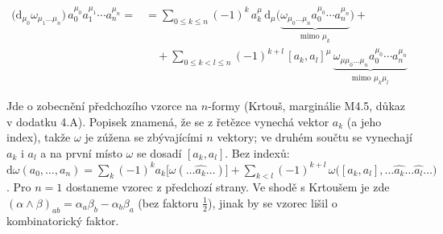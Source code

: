 \begin{veta}[Theorem]
\begin{align*}
  \big(\mathrm{d}_{\mu_0}\omega_{\mu_1\dots\mu_n}\big)\,a_0^{\mu_0}a_1^{\mu_1}\cdots a_n^{\mu_n} =
  &= \sum_{0\leq k\leq n}(-1)^k\,a_k^{\mu}\,\mathrm{d}_\mu\Big(\underbrace{\omega_{\mu_0\dots\mu_n}a_0^{\mu_0}\cdots a_n^{\mu_n}}_{\text{mimo } \mu_k}\Big) + \\
  &\quad + \sum_{0\leq k<l\leq n}(-1)^{k+l}\,[a_k,a_l]^\mu\,\underbrace{\omega_{\mu\mu_0\dots\mu_n}a_0^{\mu_0}\cdots a_n^{\mu_n}}_{\text{mimo } \mu_k\mu_l}
\end{align*}
\end{veta}

\begin{vysvetleni}
Jde o zobecnění předchozího vzorce na $n$-formy (Krtouš, marginálie M4.5, důkaz v dodatku 4.A). Popisek  znamená, že se z řetězce vynechá vektor $a_k$ (a jeho index), takže $\omega$ je zúžena se zbývajícími $n$ vektory; ve druhém součtu se vynechají $a_k$ i $a_l$ a na první místo $\omega$ se dosadí $[a_k,a_l]$. Bez indexů:
$\mathrm{d}\omega(a_0,\dots,a_n)=\sum_k(-1)^k a_k\big[\omega(\dots\widehat{a_k}\dots)\big]+\sum_{k<l}(-1)^{k+l}\,\omega\big([a_k,a_l],\dots\widehat{a_k}\dots\widehat{a_l}\dots\big)$.
Pro $n=1$ dostaneme vzorec z předchozí strany. Ve shodě s Krtoušem je zde $(\alpha\wedge\beta)_{ab}=\alpha_a\beta_b-\alpha_b\beta_a$ (bez faktoru $\tfrac12$), jinak by se vzorec lišil o kombinatorický faktor.
\end{vysvetleni}


